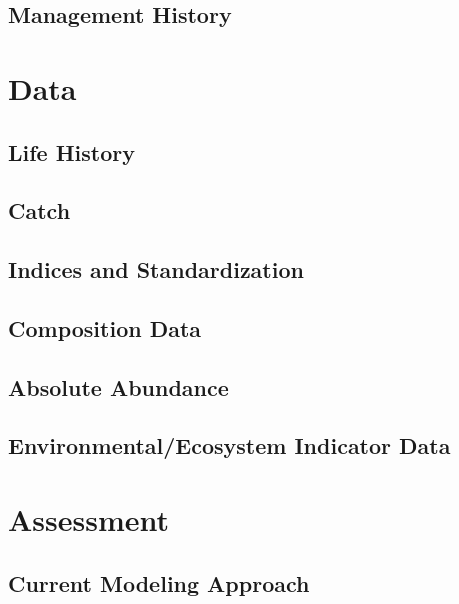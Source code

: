 \documentclass[
  letterpaper,
]{article}
\begin{document}
\subsection{Management History}\label{sec-management-history}

\newpage{}

\section{Data}\label{sec-data}

\subsection{Life History}\label{sec-life-history}

\subsection{Catch}\label{sec-catch}

\subsection{Indices and
Standardization}\label{sec-indices-and-standardization}

\subsection{Composition Data}\label{sec-composition-data}

\subsection{Absolute Abundance}\label{sec-absolute-abundance}

\subsection{Environmental/Ecosystem Indicator
Data}\label{sec-environmental-ecosystem-indicator-data}

\newpage{}

\section{Assessment}\label{sec-assmt-config}

\subsection{Current Modeling
Approach}\label{sec-current-modeling-approach}
\end{document}
